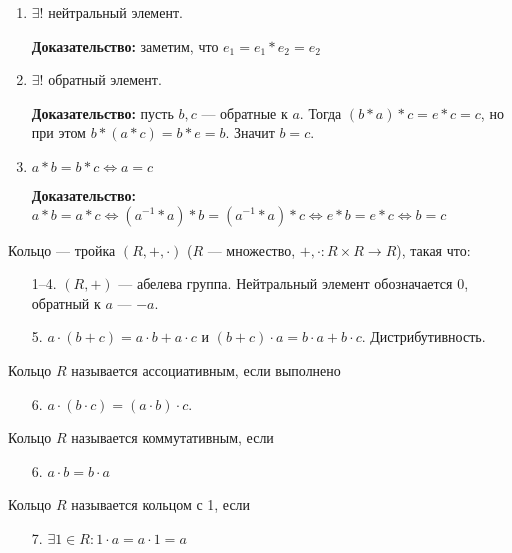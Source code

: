 \begin{enumerate}
\item $\exists!$ нейтральный элемент.

    \textbf{Доказательство:} заметим, что $e_1=e_1 \ast e_2 = e_2$
\item $\exists!$ обратный элемент. 

    \textbf{Доказательство:} пусть $b, c$ --- обратные к  $a$. Тогда  $(b\ast a)\ast c = e \ast c = c$, но при этом $b \ast (a \ast c) = b \ast e = b$. Значит  $b=c$.
\item $a \ast b = b \ast c \iff a = c$

    \textbf{Доказательство:} $a \ast b = a \ast c \iff (a^{-1} \ast a) \ast b = (a^{-1} \ast a) \ast c \iff e \ast b = e \ast c \iff b = c$
\end{enumerate}
\begin{definition}
    Кольцо --- тройка $(R, +, \cdot)$ ($R$ --- множество,  $+, \cdot: R \times R \to R$), такая что:
     \begin{enumerate}
         \item[1--4.] $(R, +)$ --- абелева группа. Нейтральный элемент обозначается $0$, обратный к  $a$ ---  $-a$.
         \item[5.] $a\cdot(b+c) = a \cdot b + a \cdot c$ и  $(b+c) \cdot a = b \cdot a + b \cdot c$. Дистрибутивность.
    \end{enumerate}
\end{definition}
\begin{definition}
    Кольцо $R$ называется ассоциативным, если выполнено 
    \begin{itemize}
        \item[6.] $a \cdot (b \cdot c) = (a \cdot b) \cdot c$.
    \end{itemize}
\end{definition}
\begin{definition}
    Кольцо $R$ называется коммутативным, если
    \begin{itemize}
        \item[6.] $a \cdot b = b \cdot a$
    \end{itemize}
\end{definition}
\begin{definition}
    Кольцо $R$ называется кольцом с 1, если  
    \begin{enumerate}
        
        \item[7.] $\exists 1 \in R: 1 \cdot a = a \cdot 1 = a$
    \end{enumerate}
\end{definition}
